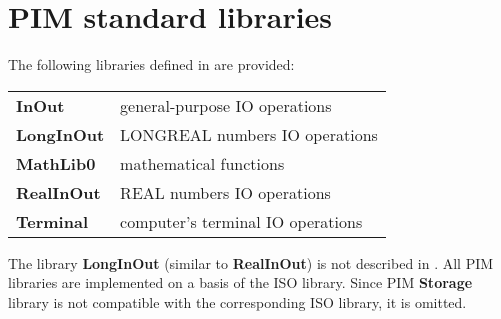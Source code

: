 \chapter{PIM standard libraries}\label{lib:PIM}

The following libraries defined in \cite{PIM} are provided:
\begin{flushleft}
\begin{tabular}{ll}
\bf InOut     & general-purpose IO operations                   \\
\bf LongInOut & LONGREAL numbers IO operations                  \\
\bf MathLib0  & mathematical functions                          \\
\bf RealInOut & REAL numbers IO operations                      \\
\bf Terminal  & computer's terminal IO operations               \\
\end{tabular}
\end{flushleft}

\noindent
The library {\bf LongInOut} (similar to {\bf RealInOut}) is not
described in \cite{PIM}. All PIM libraries are implemented on
a basis of the ISO library.
Since PIM {\bf Storage} library is not
compatible with the corresponding ISO library, it is omitted.


